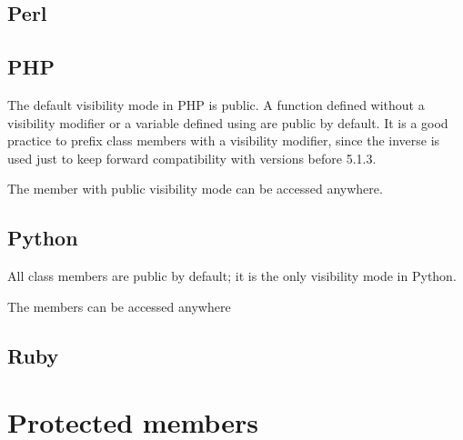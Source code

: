 \documentclass{KodeBook}
\begin{document}
\subsection{Perl}

%

\subsection{PHP}

The default visibility mode in PHP is public.
A function defined without a visibility modifier or a variable defined using  are public by default. 
It is a good practice to prefix class members with a visibility modifier, since the inverse is used just to keep forward compatibility with versions before 5.1.3.



The member with public visibility mode can be accessed anywhere.



\subsection{Python}

All class members are public by default; it is the only visibility mode in Python. 



The members can be accessed anywhere


\subsection{Ruby}

%


\section{Protected members}
\end{document}
